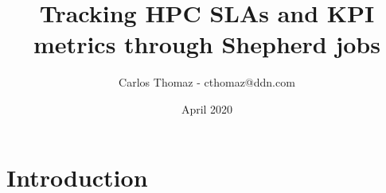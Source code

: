 \documentclass{article}
\title{Tracking HPC SLAs and KPI metrics through Shepherd jobs}
\author{Carlos Thomaz - cthomaz@ddn.com}
\date{April 2020}
\begin{document}
\maketitle

\section{Introduction}
\end{document}
